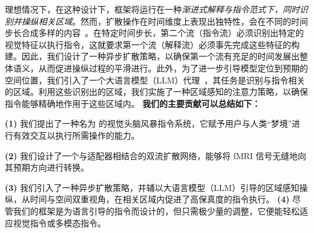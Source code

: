 理想情况下，在这种设计下，框架将运行在一种\emph{渐进式解释与指令范式下，同时识别并操纵相关区域}。然而，扩散操作在时间维度上表现出独特性，会在不同的时间步长合成多样的内容~\cite{zhang2023prospect,Zhang_2023_inst}。在特定时间步长，第二个流（指令流）必须识别出特定的视觉特征以执行指令，这就要求第一个流（解释流）必须事先完成这些特征的构建。因此，我们设计了一种异步扩散策略，以确保第一个流有充足的时间发展出整体语义，从而促进操纵过程的平滑进行。此外，为了进一步引导模型定位到预期的空间位置，我们引入了一个大语言模型（LLM）代理~\cite{wei2022emergent}，其任务是识别与指令相关的区域。利用这些识别出的区域，我们实施了一种区域感知的注意力策略，以确保指令能够精确地作用于这些区域内。
\textbf{我们的主要贡献可以总结如下：}

\noindent \textbf{(1)} 我们提出了一种名为 \textbf{\model{}} 的视觉头脑风暴指令系统，它赋予用户与人类“梦境”进行有效交互以执行所需操作的能力。

\noindent \textbf{(2)} 我们设计了一个与适配器相结合的双流扩散网络，能够将 fMRI 信号无缝地向其预期方向进行转换。

\noindent \textbf{(3)} 我们引入了一种异步扩散策略，并辅以大语言模型（LLM）引导的区域感知操纵，从时间与空间双重视角，在相关区域内促进了高保真度的指令执行。
\noindent \textbf{(4)} 尽管我们的框架是为语言引导的指令而设计的，但只需极少量的调整，它便能轻松适应视觉指令或多模态指令。
